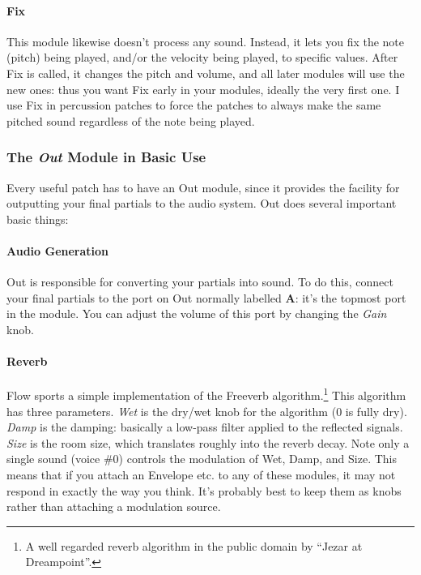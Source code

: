 \documentclass{article}
\begin{document}
\paragraph{Fix} This module likewise doesn't process any sound.  Instead, it lets you fix the note (pitch) being played, and/or the velocity being played, to specific values.  After Fix is called, it changes the pitch and volume, and all later modules will use the new ones: thus you want Fix early in your modules, ideally the very first one.  I use Fix in percussion patches to force the patches to always make the same pitched sound regardless of the note being played.

\subsubsection{The \textit{Out} Module in Basic Use}  
\label{outmodule}

Every useful patch has to have an Out module, since it provides the facility for outputting your final partials to the audio system.  Out does several important basic things:

\paragraph{Audio Generation}  Out is responsible for converting your partials into sound.  To do this, connect your final partials to the port on Out normally labelled {\bf A}: it's the topmost port in the module.  You can adjust the volume of this port by changing the {\it Gain} knob.

\paragraph{Reverb} Flow sports a simple implementation of the Freeverb algorithm.\footnote{A well regarded reverb algorithm in the public domain by ``Jezar at Dreampoint''.}  This algorithm has three parameters.  {\it Wet} is the dry/wet knob for the algorithm (0 is fully dry).  {\it Damp} is the damping: basically a low-pass filter applied to the reflected signals.  {\it Size} is the room size, which translates roughly into the reverb decay.  Note only a single sound (voice \#0) controls the modulation of Wet, Damp, and Size.  This means that if you attach an Envelope etc. to any of these modules, it may not respond in exactly the way you think.  It's probably best to keep them as knobs rather than attaching a modulation source.
\end{document}

